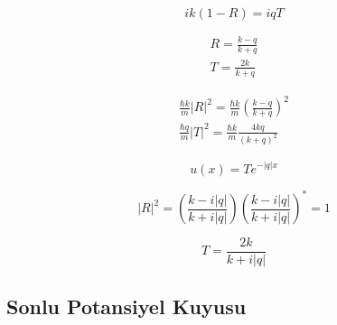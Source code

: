 \documentclass[a4paper,12pt, twoside]{article}
\begin{document}
\begin{equation}
i k ( 1 - R ) = i q T
\end{equation}


\begin{equation}
\begin{array} { l } { R = \frac { k - q } { k + q } } \\ { T = \frac { 2 k } { k + q } } \end{array}
\end{equation}


\begin{equation}
\begin{array} { l } { \frac { \hbar k } { m } | R | ^ { 2 } = \frac { \hbar k } { m } \left( \frac { k - q } { k + q } \right) ^ { 2 } } \\ { \frac { \hbar q } { m } | T | ^ { 2 } = \frac { \hbar k } { m } \frac { 4 k q } { ( k + q ) ^ { 2 } } } \end{array}
\end{equation}


\begin{equation}
u ( x ) = T e ^ { - | q | x }
\end{equation}


\begin{equation}
| R | ^ { 2 } = \left( \frac { k - i | q | } { k + i | q | } \right) \left( \frac { k - i | q | } { k + i | q | } \right) ^ { * } = 1
\end{equation}


\begin{equation}
T = \frac { 2 k } { k + i | q | }
\end{equation}


\subsection{Sonlu Potansiyel Kuyusu}

\newpage
\renewcommand\refname{Kaynaklar}
{}
 
\end{document}
